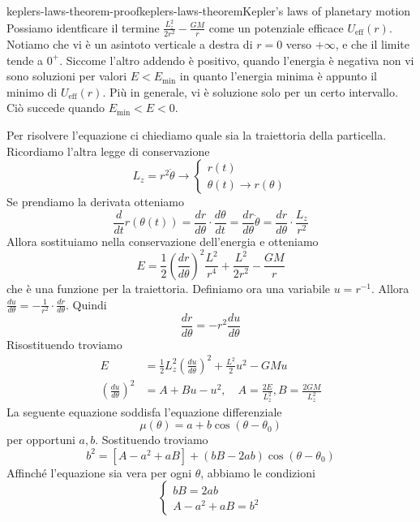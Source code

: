 \documentclass[preview]{standalone}
\begin{document}
\begin{snippetproof}{keplers-laws-theorem-proof}{keplers-laws-theorem}{Kepler's laws of planetary motion}
    Possiamo identficare il termine \(\frac{L_z^2}{2r^2} - \frac{GM}{r}\)
    come un potenziale efficace \(U_\text{eff}(r)\).
    Notiamo che vi è un asintoto verticale a destra di \(r=0\) verso \(+\infty\),
    e che il limite tende a \(0^+\).
    Siccome l'altro addendo è positivo, quando l'energia è negativa
    non vi sono soluzioni per valori \(E < E_\text{min}\)
    in quanto l'energia minima è appunto il minimo di \(U_\text{eff}(r)\).
    Più in generale, vi è soluzione solo per un certo
    intervallo. Ciò succede quando \(E_\text{min} < E < 0\). %

    Per risolvere l'equazione ci chiediamo quale sia la traiettoria della particella.
    Ricordiamo l'altra legge di conservazione
    \[
        L_z = r^2 \dot\theta \to \begin{cases}
            r(t) \\
            \theta(t) \to r(\theta)
        \end{cases}
    \]
    Se prendiamo la derivata otteniamo
    \[
        \frac{d}{dt}r(\theta(t))
        = \frac{dr}{d\theta} \cdot \frac{d\theta}{dt}
        = \frac{dr}{d\theta} \dot\theta = \frac{dr}{d\theta} \cdot \frac{L_z}{r^2}
    \]
    Allora sostituiamo nella conservazione dell'energia e otteniamo
    \[
        E = \frac{1}{2}
        {\left(\frac{dr}{d\theta}\right)}^2 \frac{L^2}{r^4} + \frac{L^2}{2r^2} - \frac{GM}{r}
    \]
    che è una funzione per la traiettoria.
    Definiamo ora una variabile
    \(u = r^{-1}\).
    Allora \(\frac{du}{d\theta} = -\frac{1}{r^2} \cdot \frac{dr}{d\theta}\).
    Quindi
    \[
        \frac{dr}{d\theta} = -r^2 \frac{du}{d\theta}
    \]
    Risostituendo troviamo
    \begin{align*}
        E &= \frac{1}{2} L_z^2 {\left(\frac{du}{d\theta}\right)}^2 + \frac{L^2}{2}u^2 - GMu \\
        {\left(\frac{du}{d\theta}\right)}^2 &= A + Bu - u^2,
        \quad A = \frac{2E}{L_z^2}, B = \frac{2GM}{L_z^2}
    \end{align*}
    La seguente equazione soddisfa l'equazione differenziale
    \[
        \mu(\theta) = a + b\cos(\theta - \theta_0)
    \]
    per opportuni \(a,b\).
    Sostituendo troviamo
    \[
        b^2 = [A-a^2 + aB] + (bB - 2ab)\cos(\theta - \theta_0)
    \]
    Affinché l'equazione sia vera per ogni \(\theta\), abbiamo le condizioni
    \[
        \begin{cases}
            bB = 2ab \\
            A - a^2 + aB = b^2
        \end{cases}
\]
\end{snippetproof}
\end{document}

